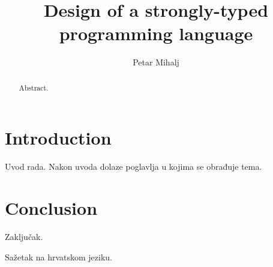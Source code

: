 \documentclass[times, utf8, diplomski]{fer}
\begin{document}

\title{Design of a strongly-typed programming language}

\author{Petar Mihalj}

\maketitle




\tableofcontents

\chapter{Introduction}
Uvod rada. Nakon uvoda dolaze poglavlja u kojima se obrađuje tema.
\citep{ungar2002uvod}

\chapter{Conclusion}
Zaključak.




\begin{sazetak}
Sažetak na hrvatskom jeziku.

\end{sazetak}

\begin{abstract}
Abstract.

\end{abstract}
\end{document}
